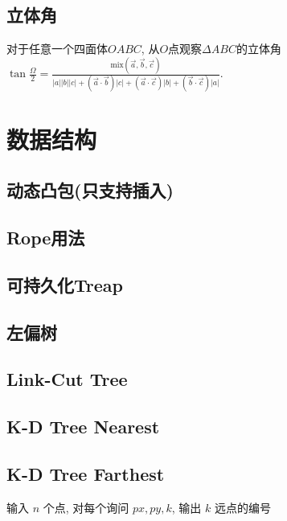 \documentclass[landscape, twocolumn, 8pt, a4paper, twoside]{extarticle}
\begin{document}
  \subsection{立体角}
    对于任意一个四面体$OABC$,
    从$O$点观察$\Delta ABC$的立体角$\tan{\frac{\Omega}{2}} = 
    \frac{\textrm{mix}(\overrightarrow{a}, \overrightarrow{b}, \overrightarrow{c}) }{
        |a||b||c|
      + (\overrightarrow{a} \cdot \overrightarrow{b}) |c|
      + (\overrightarrow{a} \cdot \overrightarrow{c}) |b|
      + (\overrightarrow{b} \cdot \overrightarrow{c}) |a|
    }$.

\section{数据结构}
  \subsection{动态凸包(只支持插入)}
    
    
  \subsection{Rope用法}
    
  
  \subsection{可持久化Treap}
    
  
  \subsection{左偏树}
    
  
  \subsection{Link-Cut Tree}
    

  \subsection{K-D Tree Nearest}
    

  \subsection{K-D Tree Farthest}
    输入 $n$ 个点, 对每个询问 $px, py, k$, 输出 $k$ 远点的编号
    
\end{document}
